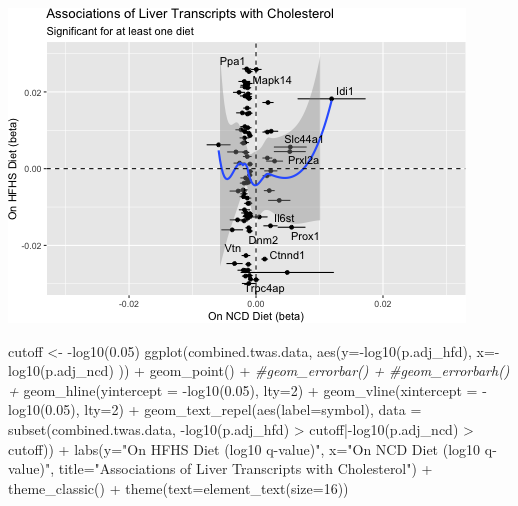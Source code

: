 \documentclass[
]{article}
\newenvironment{Shaded}{\begin{snugshade}}{\end{snugshade}}
\newcommand{\AttributeTok}[1]{\textcolor[rgb]{0.77,0.63,0.00}{#1}}
\newcommand{\CommentTok}[1]{\textcolor[rgb]{0.56,0.35,0.01}{\textit{#1}}}
\newcommand{\DecValTok}[1]{\textcolor[rgb]{0.00,0.00,0.81}{#1}}
\newcommand{\FloatTok}[1]{\textcolor[rgb]{0.00,0.00,0.81}{#1}}
\newcommand{\FunctionTok}[1]{\textcolor[rgb]{0.00,0.00,0.00}{#1}}
\newcommand{\NormalTok}[1]{#1}
\newcommand{\OtherTok}[1]{\textcolor[rgb]{0.56,0.35,0.01}{#1}}
\newcommand{\SpecialCharTok}[1]{\textcolor[rgb]{0.00,0.00,0.00}{#1}}
\newcommand{\StringTok}[1]{\textcolor[rgb]{0.31,0.60,0.02}{#1}}
\begin{document}
\includegraphics{figures/twas-chol-integrated-3.png}

\begin{Shaded}
\begin{Highlighting}[]
\NormalTok{cutoff }\OtherTok{\textless{}{-}} \SpecialCharTok{{-}}\FunctionTok{log10}\NormalTok{(}\FloatTok{0.05}\NormalTok{)}
\FunctionTok{ggplot}\NormalTok{(combined.twas.data, }
       \FunctionTok{aes}\NormalTok{(}\AttributeTok{y=}\SpecialCharTok{{-}}\FunctionTok{log10}\NormalTok{(p.adj\_hfd), }\AttributeTok{x=}\SpecialCharTok{{-}}\FunctionTok{log10}\NormalTok{(p.adj\_ncd) )) }\SpecialCharTok{+}
  \FunctionTok{geom\_point}\NormalTok{() }\SpecialCharTok{+}
  \CommentTok{\#geom\_errorbar() +}
  \CommentTok{\#geom\_errorbarh() +}
  \FunctionTok{geom\_hline}\NormalTok{(}\AttributeTok{yintercept =} \SpecialCharTok{{-}}\FunctionTok{log10}\NormalTok{(}\FloatTok{0.05}\NormalTok{), }\AttributeTok{lty=}\DecValTok{2}\NormalTok{) }\SpecialCharTok{+}
  \FunctionTok{geom\_vline}\NormalTok{(}\AttributeTok{xintercept =} \SpecialCharTok{{-}}\FunctionTok{log10}\NormalTok{(}\FloatTok{0.05}\NormalTok{), }\AttributeTok{lty=}\DecValTok{2}\NormalTok{) }\SpecialCharTok{+}
  \FunctionTok{geom\_text\_repel}\NormalTok{(}\FunctionTok{aes}\NormalTok{(}\AttributeTok{label=}\NormalTok{symbol),}
                   \AttributeTok{data =} \FunctionTok{subset}\NormalTok{(combined.twas.data, }\SpecialCharTok{{-}}\FunctionTok{log10}\NormalTok{(p.adj\_hfd) }\SpecialCharTok{\textgreater{}}\NormalTok{ cutoff}\SpecialCharTok{|{-}}\FunctionTok{log10}\NormalTok{(p.adj\_ncd) }\SpecialCharTok{\textgreater{}}\NormalTok{ cutoff)) }\SpecialCharTok{+}
  \FunctionTok{labs}\NormalTok{(}\AttributeTok{y=}\StringTok{"On HFHS Diet (log10 q{-}value)"}\NormalTok{,}
       \AttributeTok{x=}\StringTok{"On NCD Diet (log10 q{-}value)"}\NormalTok{,}
       \AttributeTok{title=}\StringTok{"Associations of Liver Transcripts with Cholesterol"}\NormalTok{) }\SpecialCharTok{+}
  \FunctionTok{theme\_classic}\NormalTok{() }\SpecialCharTok{+}
  \FunctionTok{theme}\NormalTok{(}\AttributeTok{text=}\FunctionTok{element\_text}\NormalTok{(}\AttributeTok{size=}\DecValTok{16}\NormalTok{))}
\end{Highlighting}
\end{Shaded}
\end{document}
